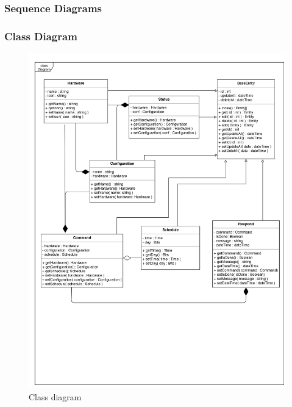 \documentclass[12pt, oneside, a4paper]{book}
\begin{document}
				\subsubsection{Sequence Diagrams}
				\newpage\subsubsection{Class Diagram}
					\begin{figure}[H]
						\caption{Class diagram}
						\includegraphics[width=\linewidth]{img/diagram_class.jpg}
					\end{figure}
			
\end{document}
